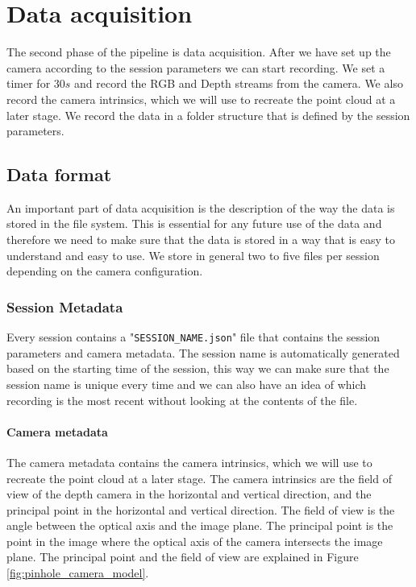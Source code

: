 \section{Data acquisition}
\label{sec:data_acquisition}

The second phase of the pipeline is data acquisition. After we have set up the camera according to the session parameters we can start recording. We set a timer for $30s$ and record the RGB and Depth streams from the camera. We also record the camera intrinsics, which we will use to recreate the point cloud at a later stage. We record the data in a folder structure that is defined by the session parameters.

\subsection{Data format}

An important part of data acquisition is the description of the way the data is stored in the file system. This is essential for any future use of the data and therefore we need to make sure that the data is stored in a way that is easy to understand and easy to use. We store in general two to five files per session depending on the camera configuration. 

\subsubsection{Session Metadata}

Every session contains a "\texttt{SESSION\_NAME.json}" file that contains the session parameters and camera metadata. The session name is automatically generated based on the starting time of the session, this way we can make sure that the session name is unique every time and we can also have an idea of which recording is the most recent without looking at the contents of the file.

\paragraph{Camera metadata}

The camera metadata contains the camera intrinsics, which we will use to recreate the point cloud at a later stage. The camera intrinsics are the field of view of the depth camera in the horizontal and vertical direction, and the principal point in the horizontal and vertical direction. The field of view is the angle between the optical axis and the image plane. The principal point is the point in the image where the optical axis of the camera intersects the image plane. The principal point and the field of view are explained in Figure \ref{fig:pinhole_camera_model}.

